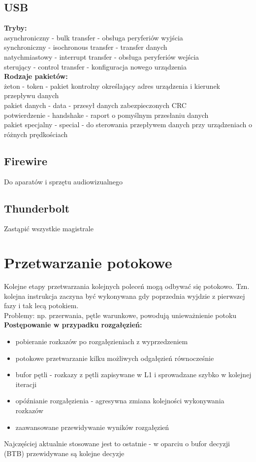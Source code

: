 \documentclass[a4paper]{article}
\begin{document}
\subsection{USB}
\textbf{Tryby: }\\
asynchroniczny - bulk transfer - obsługa peryferiów wyjścia\\
synchroniczny - isochronous transfer - transfer danych\\
natychmiastowy - interrupt transfer - obsługa peryferiów wejścia\\
sterujący - control transfer - konfiguracja nowego urządzenia\\
\textbf{Rodzaje pakietów: }\\
żeton - token - pakiet kontrolny określający adres urządzenia i kierunek przepływu danych\\
pakiet danych - data - przesył danych zabezpieczonych CRC\\
potwierdzenie - handshake - raport o pomyślnym przesłaniu danych\\
pakiet specjalny - special - do sterowania przepływem danych przy urządzeniach o różnych prędkościach\\
\subsection{Firewire}
Do aparatów i sprzętu audiowizualnego
\subsection{Thunderbolt}
Zastąpić wszystkie magistrale
\newpage

\section{Przetwarzanie potokowe}
Kolejne etapy przetwarzania kolejnych poleceń mogą odbywać się potokowo. Tzn. kolejna instrukcja zaczyna być wykonywana gdy poprzednia wyjdzie z pierwszej fazy i tak lecą potokiem. \\
Problemy: np. przerwania, pętle warunkowe, powodują unieważnienie potoku \\
\textbf{Postępowanie w przypadku rozgałęzień: }\\
\begin{itemize}
\item pobieranie rozkazów po rozgałęzieniach z wyprzedzeniem
\item potokowe przetwarzanie kilku możliwych odgałęzień równocześnie
\item bufor pętli - rozkazy z pętli zapisywane w L1 i sprowadzane szybko w kolejnej iteracji
\item opóźnianie rozgałęzienia - agresywna zmiana kolejności wykonywania rozkazów
\item zaawansowane przewidywanie wyników rozgałęzień
\end{itemize}
Najczęściej aktualnie stosowane jest to ostatnie - w oparciu o bufor decyzji (BTB) przewidywane są kolejne decyzje\\
\end{document}
